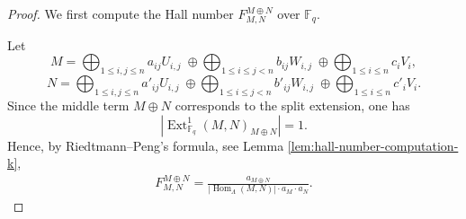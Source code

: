 \documentclass[12pt]{amsart}
\theoremstyle{remark}
\theoremstyle{definition}
\numberwithin{equation}{section}
\newcommand{\Hom}{\operatorname{Hom}\nolimits}
\newcommand{\Ext}{\operatorname{Ext}\nolimits}
\begin{document}
\begin{proof}
We first compute the Hall number $F_{M,N}^{M\oplus N}$ over $\mathbb{F}_q$.
   

Let
\[
M=
\bigoplus_{1\leq i,j\leq n} a_{ij}U_{i,j}
\;\oplus\!
\bigoplus_{1\leq i\leq j<n} b_{ij}W_{i,j}
\;\oplus\!
\bigoplus_{1\leq i\leq n} c_iV_i,
\]
\[
N=
\bigoplus_{1\leq i,j\leq n} a'_{ij}U_{i,j}
\;\oplus\!
\bigoplus_{1\leq i\leq j<n} b'_{ij}W_{i,j}
\;\oplus\!
\bigoplus_{1\leq i\leq n} c'_iV_i.
\]
Since the middle term $M\oplus N$ corresponds to the split extension, one has
\[
\left|\Ext_{\mathbb{F}_q}^1(M,N)_{M\oplus N}\right|=1.
\]
Hence, by Riedtmann--Peng's formula, see Lemma \ref{lem:hall-number-computation-k},
\begin{align}\label{formula:ridt-peng-split}
    F_{M,N}^{M\oplus N}
=
\frac{ a_{M\oplus N}}
{\left| \Hom_\Lambda(M,N) \right| \cdot a_M \cdot a_N}.
\end{align}


\end{proof}
\end{document}
